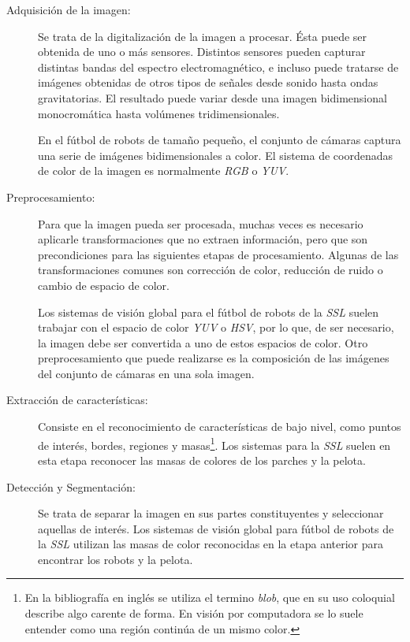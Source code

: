 \begin{description}

	\item[Adquisición de la imagen:] Se trata de la digitalización de la
		imagen a procesar. Ésta puede ser obtenida de uno o más
		sensores. Distintos sensores pueden capturar distintas bandas
		del espectro electromagnético, e incluso puede tratarse de
		imágenes obtenidas de otros tipos de señales desde sonido
		hasta ondas gravitatorias. El resultado puede variar desde una
		imagen bidimensional monocromática hasta volúmenes
		tridimensionales.

		En el fútbol de robots de tamaño pequeño, el conjunto de cámaras
		captura una serie de imágenes bidimensionales a color. El
		sistema de coordenadas de color de la imagen es normalmente
		\emph{RGB} o \emph{YUV}.

	\item[Preprocesamiento:] Para que la imagen pueda ser procesada, muchas
		veces es necesario aplicarle transformaciones que no extraen
		información, pero que son precondiciones para las siguientes
		etapas de procesamiento. Algunas de las transformaciones comunes
		son corrección de color, reducción de ruido o cambio de espacio
		de color.

		Los sistemas de visión global para el fútbol de robots de la
		\emph{SSL} suelen trabajar con el espacio de color \emph{YUV}
		o \emph{HSV}, por lo que, de ser necesario, la imagen debe ser
		convertida a uno de estos espacios de color. Otro
		preprocesamiento que puede realizarse es la composición de las
		imágenes del conjunto de cámaras en una sola imagen.

	\item[Extracción de características:] Consiste en el reconocimiento de
		características de bajo nivel, como puntos de interés, bordes,
		regiones y masas\footnote{En la bibliografía en inglés se
		utiliza el termino \emph{blob}, que en su uso coloquial
		describe algo carente de forma. En visión por computadora se
		lo suele entender como una región continúa de un mismo
		color.}. Los sistemas para la \emph{SSL} suelen en esta etapa
		reconocer las masas de colores de los parches y la pelota.

	\item[Detección y Segmentación:] Se trata de separar la imagen en sus
		partes constituyentes y seleccionar aquellas de interés. Los
		sistemas de visión global para fútbol de robots de la \emph{SSL}
		utilizan las masas de color reconocidas en la etapa anterior
		para encontrar los robots y la pelota.


\end{description}
